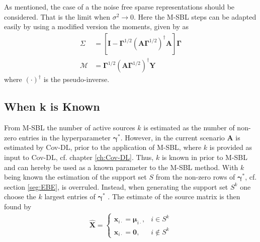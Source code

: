 As mentioned, the case of a the noise free sparse representations should be considered. That is the limit when $\sigma^2\rightarrow 0$. Here the M-SBL steps can be adapted easily by using a modified version the moments, given by \cite[p.148]{phd_wipf} as 
\begin{align*}
\Sigma &= \left[ \textbf{I} - \boldsymbol{\Gamma}^{1/2} \left( \mathbf{A} \boldsymbol{\Gamma}^{1/2}\right)^{\dagger} \mathbf{A} \right]\boldsymbol{\Gamma}\\
\mathcal{M} &= \boldsymbol{\Gamma}^{1/2}\left( \mathbf{A} \boldsymbol{\Gamma}^{1/2}\right)^{\dagger} \mathbf{Y}
\end{align*} 
where $(\cdot)^{\dagger}$ is the pseudo-inverse.

\subsection{When k is Known}\label{subsec:kestimate}
From M-SBL the number of active sources $k$ is estimated as the number of non-zero entries in the hyperparameter $\boldsymbol{\gamma}^{\ast}$.
However, in the current scenario $\textbf{A}$ is estimated by Cov-DL, prior to the application of M-SBL, where $k$ is provided as input to Cov-DL, cf. chapter \ref{ch:Cov-DL}.
Thus, $k$ is known in prior to M-SBL and can hereby be used as a known parameter to the M-SBL method. 
With $k$ being known the estimation of the support set $S$ from the non-zero rows of $\boldsymbol{\gamma}^{\ast}$, cf. section \ref{seg:EBE}, is overruled.
Instead, when generating the support set $S^k$ one choose the $k$ largest entries of $\boldsymbol{\gamma}^{\ast}$ \cite[p. 3]{Balkan2014}.
The estimate of the source matrix is then found by
\begin{align*}
\hat{\mathbf{X}} = 
\begin{cases}
\mathbf{x}_{i\cdot} = \boldsymbol{\mu}_{i \cdot}, & i \in S^k \\
\mathbf{x}_{i\cdot} = \mathbf{0}, & i \not \in S^k
\end{cases}
\end{align*}



